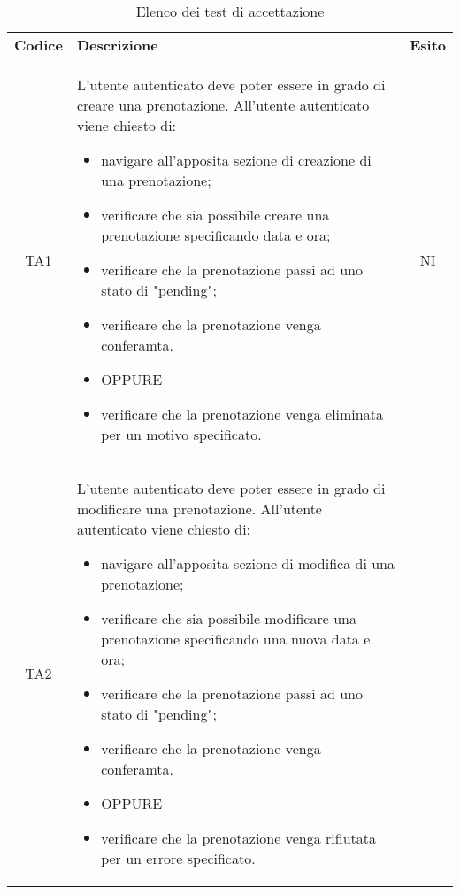{
    \renewcommand{\arraystretch}{1.5}
    \centering
    \begin{longtable}{ c C{11cm} c }
        \caption{Elenco dei test di accettazione}\\
        \rowcolor{\primaryColor}
        \textcolor{\secondaryColor}{
        \textbf{Codice}}     & \textcolor{\secondaryColor}
        {\textbf{Descrizione}} & \textcolor{\secondaryColor}{\textbf{Esito}} \\


        TA1&
        L'utente autenticato deve poter essere in grado di creare una prenotazione.\newline
        All'utente autenticato viene chiesto di:
        \begin{itemize}
            \item navigare all'apposita sezione di creazione di una prenotazione;
            \item verificare che sia possibile creare una prenotazione specificando data e ora;
            \item verificare che la prenotazione passi ad uno stato di "pending";
            \item verificare che la prenotazione venga conferamta.
            \item [] OPPURE
            \item verificare che la prenotazione venga eliminata per un motivo specificato.
        \end{itemize}&
        NI\\
        TA2&
        L'utente autenticato deve poter essere in grado di modificare una prenotazione.\newline
        All'utente autenticato viene chiesto di:
        \begin{itemize}
            \item navigare all'apposita sezione di modifica di una prenotazione;
            \item verificare che sia possibile modificare una prenotazione specificando una nuova data e ora;
            \item verificare che la prenotazione passi ad uno stato di "pending";
            \item verificare che la prenotazione venga conferamta.
            \item [] OPPURE
            \item verificare che la prenotazione venga rifiutata per un errore specificato.
        \end{itemize}&

\end{longtable}}
